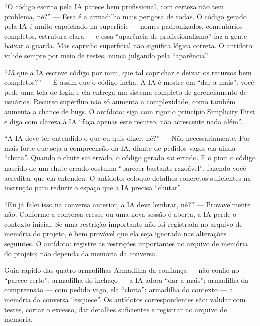 
“O código escrito pela IA parece bem profissional, com certeza não tem problema, né?” — Essa é a armadilha mais perigosa de todas. O código gerado pela IA é muito caprichado na superfície — nomes padronizados, comentários completos, estrutura clara — e essa “aparência de profissionalismo” faz a gente baixar a guarda. Mas capricho superficial não significa lógica correta. O antídoto: valide sempre por meio de testes, nunca julgando pela “aparência”.


“Já que a IA escreve código por mim, que tal caprichar e deixar os recursos bem completos?” — É assim que o código incha. A IA é mestre em “dar a mais”: você pede uma tela de login e ela entrega um sistema completo de gerenciamento de usuários. Recurso supérfluo não só aumenta a complexidade, como também aumenta a chance de bugs. O antídoto: siga com rigor o princípio Simplicity First e diga com clareza à IA “faça apenas este recurso, não acrescente nada além”.


“A IA deve ter entendido o que eu quis dizer, né?” — Não necessariamente. Por mais forte que seja a compreensão da IA, diante de pedidos vagos ela ainda “chuta”. Quando o chute sai errado, o código gerado sai errado. E o pior: o código nascido de um chute errado costuma “parecer bastante razoável”, fazendo você acreditar que ela entendeu. O antídoto: coloque detalhes concretos suficientes na instrução para reduzir o espaço que a IA precisa “chutar”.


“Eu já falei isso na conversa anterior, a IA deve lembrar, né?” — Provavelmente não. Conforme a conversa cresce ou uma nova sessão é aberta, a IA perde o contexto inicial. Se uma restrição importante não foi registrada no arquivo de memória do projeto, é bem provável que ela seja ignorada nas alterações seguintes. O antídoto: registre as restrições importantes no arquivo de memória do projeto; não dependa da memória da conversa.

\begin{tcbwarn}{Guia rápido das quatro armadilhas}
Armadilha da confiança — não confie no “parece certo”; armadilha do inchaço — a IA adora “dar a mais”; armadilha da compreensão — com pedido vago, ela “chuta”; armadilha do contexto — a memória da conversa “esquece”. Os antídotos correspondentes são: validar com testes, cortar o excesso, dar detalhes suficientes e registrar no arquivo de memória.

\end{tcbwarn}

